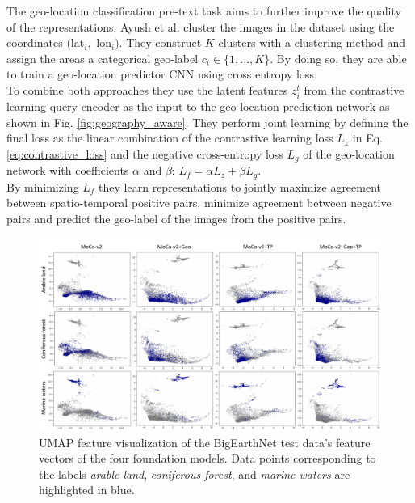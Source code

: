 The geo-location classification pre-text task aims to further improve the quality of the representations. Ayush et al. \cite{geoAwareSelfSuper} cluster the images in the dataset using the coordinates $($lat$_i,$ lon$_i)$. They construct $K$ clusters with a clustering method and assign the areas a categorical geo-label $c_i\in\{1, ..., K\}$. By doing so, they are able to train a geo-location predictor CNN using cross entropy loss. \\
To combine both approaches they use the latent features $z_i^t$ from the contrastive learning query encoder as the input to the geo-location prediction network as shown in Fig. \ref{fig:geography_aware}. They perform joint learning by defining the final loss as the linear combination of the contrastive learning loss $L_z$ in Eq. \ref{eq:contrastive_loss} and the negative cross-entropy loss $L_g$ of the geo-location network with coefficients $\alpha$ and $\beta$: $L_f = \alpha L_z + \beta L_g$. \\
By minimizing $L_f$ they learn representations to jointly maximize agreement between spatio-temporal positive pairs, minimize agreement between negative pairs and predict the geo-label of the images from the positive pairs.

\begin{figure}[t]
  \centering
   \includegraphics[width=\linewidth]{figures/UMAPVisualization.pdf}
   \caption{UMAP feature visualization of the BigEarthNet test data's feature vectors of the four foundation models. Data points corresponding to the labels \textit{arable land}, \textit{coniferous forest}, and \textit{marine waters} are highlighted in blue.}
   \label{fig:umap}
\end{figure}